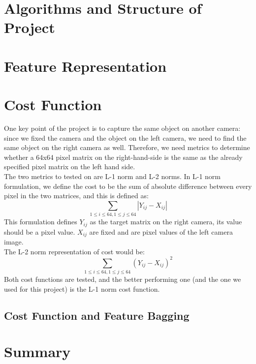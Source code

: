 \documentclass{article}
\begin{document}
\section{Algorithms and Structure of Project}

\section{Feature Representation}

\section{Cost Function}
One key point of the project is to capture the same object on another camera: since we fixed the camera and the object on the left camera, we need to find the same object on the right camera as well. Therefore, we need metrics to determine whether a 64x64 pixel matrix on the right-hand-side is the same as the already specified pixel matrix on the left hand side. \\
The two metrics to tested on are L-1 norm and L-2 norms. In L-1 norm formulation, we define the cost to be the sum of absolute difference between every pixel in the two matrices, and this is defined as:
\begin{equation}
 \sum\limits_{1\leq i \leq 64, 1 \leq j \leq 64} |Y_{ij} - X_{ij} |
\end{equation}
This formulation defines $Y_{ij}$ as the target matrix on the right camera, its value should be a pixel value. $X_{ij}$ are fixed and are pixel values of the left camera image.\\
The L-2 norm representation of cost would be: \begin{equation}
\sum\limits_{1\leq i \leq 64, 1 \leq j \leq 64} (Y_{ij} - X_{ij})^2
\end{equation} 
Both cost functions are tested, and the better performing one (and the one we used for this project) is the L-1 norm cost function. 


\subsection{Cost Function and Feature Bagging}


\section{Summary}
\end{document}
